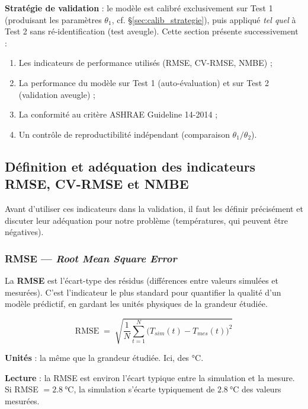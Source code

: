 \documentclass[11pt,a4paper]{article}
\begin{document}
\textbf{Stratégie de validation} : le modèle est calibré exclusivement sur Test 1
(produisant les paramètres $\theta_1$, cf. \S\ref{sec:calib_strategie}), puis appliqué
\emph{tel quel} à Test 2 sans ré-identification (test aveugle). Cette section présente
successivement :
\begin{enumerate}[itemsep=0pt]
\item Les indicateurs de performance utilisés (RMSE, CV-RMSE, NMBE) ;
\item La performance du modèle sur Test 1 (auto-évaluation) et sur Test 2 (validation aveugle) ;
\item La conformité au critère ASHRAE Guideline 14-2014 ;
\item Un contrôle de reproductibilité indépendant (comparaison $\theta_1 / \theta_2$).
\end{enumerate}

\subsection{Définition et adéquation des indicateurs RMSE, CV-RMSE et NMBE}\label{sec:metriques_def}

Avant d'utiliser ces indicateurs dans la validation, il faut les définir précisément et
discuter leur adéquation pour notre problème (températures, qui peuvent être négatives).

\subsubsection*{RMSE — \emph{Root Mean Square Error}}

\begin{principe}
La \textbf{RMSE} est l'écart-type des résidus (différences entre valeurs simulées et
mesurées). C'est l'indicateur le plus standard pour quantifier la qualité d'un modèle
prédictif, en gardant les unités physiques de la grandeur étudiée.
\end{principe}

\begin{equation}
\boxed{\;\mathrm{RMSE} \;=\; \sqrt{\frac{1}{N}\sum_{t=1}^{N}\big(T_{sim}(t) - T_{mes}(t)\big)^2}\;}
\end{equation}

\textbf{Unités} : la même que la grandeur étudiée. Ici, des \si{\celsius}.

\textbf{Lecture} : la RMSE est environ l'écart \og typique \fg{} entre la simulation et
la mesure. Si RMSE $= \SI{2,8}{\celsius}$, la simulation s'écarte typiquement de
$\SI{2,8}{\celsius}$ des valeurs mesurées.
\end{document}
